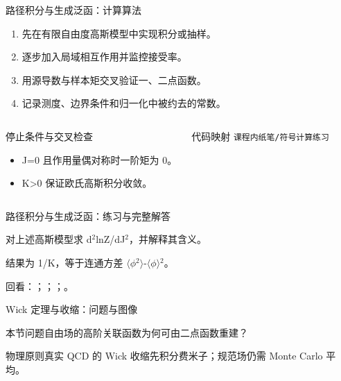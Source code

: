 \begin{frame}[t]{路径积分与生成泛函：计算算法}
\footnotesize
{}\begin{enumerate}
\item 先在有限自由度高斯模型中实现积分或抽样。
\item 逐步加入局域相互作用并监控接受率。
\item 用源导数与样本矩交叉验证一、二点函数。
\item 记录测度、边界条件和归一化中被约去的常数。
\end{enumerate}\begin{columns}[T,onlytextwidth]
\begin{block}{停止条件与交叉检查}\scriptsize\begin{itemize}
\item[\CheckMark] J=0 且作用量偶对称时一阶矩为 0。
\item[\CheckMark] K>0 保证欧氏高斯积分收敛。
\end{itemize}\end{block}
\begin{block}{代码映射}
\scriptsize \texttt{课程内纸笔/\allowbreak{}符号计算练习}
\end{block}\end{columns}\end{frame}

\begin{frame}[t]{路径积分与生成泛函：练习与完整解答}
\footnotesize
\begin{block}{}对上述高斯模型求 d\ensuremath{^{2}}lnZ/\allowbreak{}dJ\ensuremath{^{2}}，并解释其含义。\end{block}
\begin{exampleblock}{}结果为 1/\allowbreak{}K，等于连通方差 \ensuremath{\langle}\ensuremath{\phi}\ensuremath{^{2}}\ensuremath{\rangle}-\ensuremath{\langle}\ensuremath{\phi}\ensuremath{\rangle}\ensuremath{^{2}}。\end{exampleblock}
\vfill
\scriptsize 回看：；；；。
\end{frame}

\begin{frame}[t]{Wick 定理与收缩：问题与图像}
\footnotesize
\begin{block}{本节问题}自由场的高阶关联函数为何可由二点函数重建？\end{block}
\begin{block}{物理原则}\quad 真实 QCD 的 Wick 收缩先积分费米子；规范场仍需 Monte Carlo 平均。\end{block}
\end{frame}

